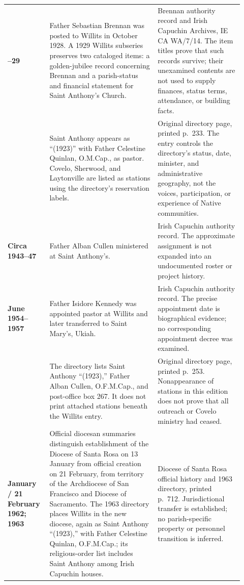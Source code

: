 \begin{longtable}{>{\bfseries\RaggedRight\arraybackslash}p{0.15\linewidth}>{\RaggedRight\arraybackslash}p{0.43\linewidth}>{\RaggedRight\arraybackslash}p{0.34\linewidth}}
1928--29 & Father Sebastian Brennan was posted to Willits in October 1928. A 1929 Willits subseries preserves two cataloged items: a golden-jubilee record concerning Brennan and a parish-status and financial statement for Saint Anthony's Church. & Brennan authority record and Irish Capuchin Archives, IE CA WA/7/14. The item titles prove that such records survive; their unexamined contents are not used to supply finances, status terms, attendance, or building facts.\\

1941 & Saint Anthony appears as ``(1923)'' with Father Celestine Quinlan, O.M.Cap., as pastor. Covelo, Sherwood, and Laytonville are listed as stations using the directory's reservation labels. & Original directory page, printed p.~233. The entry controls the directory's status, date, minister, and administrative geography, not the voices, participation, or experience of Native communities.\\

Circa 1943--47 & Father Alban Cullen ministered at Saint Anthony's. & Irish Capuchin authority record. The approximate assignment is not expanded into an undocumented roster or project history.\\

17 June 1954--1957 & Father Isidore Kennedy was appointed pastor at Willits and later transferred to Saint Mary's, Ukiah. & Irish Capuchin authority record. The precise appointment date is biographical evidence; no corresponding appointment decree was examined.\\

1960 & The directory lists Saint Anthony ``(1923),'' Father Alban Cullen, O.F.M.Cap., and post-office box 267. It does not print attached stations beneath the Willits entry. & Original directory page, printed p.~253. Nonappearance of stations in this edition does not prove that all outreach or Covelo ministry had ceased.\\

13 January / 21 February 1962; 1963 & Official diocesan summaries distinguish establishment of the Diocese of Santa Rosa on 13 January from official creation on 21 February, from territory of the Archdiocese of San Francisco and Diocese of Sacramento. The 1963 directory places Willits in the new diocese, again as Saint Anthony ``(1923),'' with Father Celestine Quinlan, O.F.M.Cap.; its religious-order list includes Saint Anthony among Irish Capuchin houses. & Diocese of Santa Rosa official history and 1963 directory, printed p.~712. Jurisdictional transfer is established; no parish-specific property or personnel transition is inferred.\\


\end{longtable}

